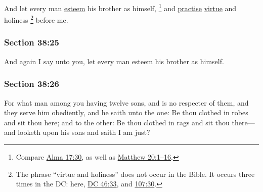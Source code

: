 		And let every man \hyperref[ESTEEM]{esteem} his brother as himself,%
		\footnote{%
			Compare \hyperref[ALMA-17-30]{Alma 17:30}, as well as \hyperref[MATTHEW-20-1]{Matthew 20:1--16}.
			} 
		and \hyperref[PRACTICE]{practise} \hyperref[VIRTUE]{virtue} and holiness%
			\footnote{%
				The phrase ``virtue and holiness'' does not occur in the Bible. It occurs three times in the DC: here, \hyperref[DC46-33]{DC 46:33}, and \hyperref[DC107-30]{107:30}.
				}
		before me.


	\subsubsection{Section 38:25} %
		\label{DC38-25}

		And again I say unto you, let every man esteem his brother as himself.


	\subsubsection{Section 38:26} %
		\label{DC38-26}

		For what man among you having twelve sons, and is no respecter of them, and they serve him obediently, and he saith unto the one: Be thou clothed in robes and sit thou here; and to the other: Be thou clothed in rags and sit thou there---and looketh upon his sons and saith I am just?


